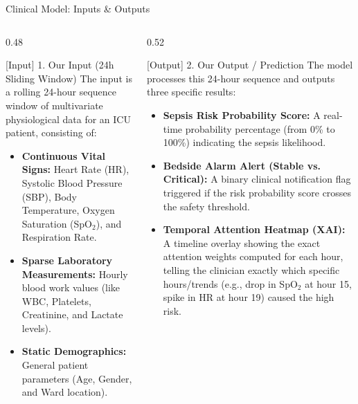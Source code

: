 \documentclass[aspectratio=169, 11pt]{beamer}
\begin{document}
\begin{frame}{Clinical Model: Inputs \& Outputs}
    \begin{columns}[t]
        \begin{column}{0.48\textwidth}
            \begin{block}{[Input] 1. Our Input (24h Sliding Window)}
                \scriptsize
                The input is a rolling 24-hour sequence window of multivariate physiological data for an ICU patient, consisting of:
                \begin{itemize}
                    \scriptsize
                    \item \textbf{Continuous Vital Signs:} Heart Rate (HR), Systolic Blood Pressure (SBP), Body Temperature, Oxygen Saturation (SpO$_2$), and Respiration Rate.
                    \item \textbf{Sparse Laboratory Measurements:} Hourly blood work values (like WBC, Platelets, Creatinine, and Lactate levels).
                    \item \textbf{Static Demographics:} General patient parameters (Age, Gender, and Ward location).
                \end{itemize}
            \end{block}
        \end{column}
        
        \begin{column}{0.52\textwidth}
            \begin{block}{[Output] 2. Our Output / Prediction}
                \scriptsize
                The model processes this 24-hour sequence and outputs three specific results:
                \begin{itemize}
                    \scriptsize
                    \item \textbf{Sepsis Risk Probability Score:} A real-time probability percentage (from 0\% to 100\%) indicating the sepsis likelihood.
                    \item \textbf{Bedside Alarm Alert (Stable vs. Critical):} A binary clinical notification flag triggered if the risk probability score crosses the safety threshold.
                    \item \textbf{Temporal Attention Heatmap (XAI):} A timeline overlay showing the exact attention weights computed for each hour, telling the clinician exactly which specific hours/trends (e.g., drop in SpO$_2$ at hour 15, spike in HR at hour 19) caused the high risk.
                \end{itemize}
            \end{block}
        \end{column}
    \end{columns}
\end{frame}
\end{document}
